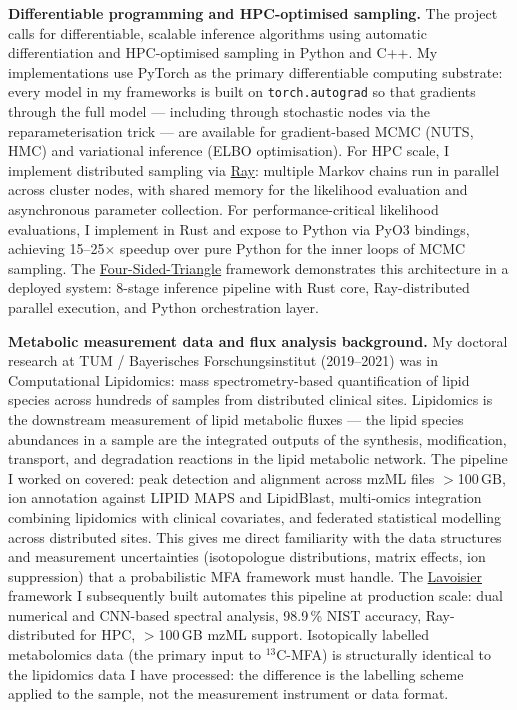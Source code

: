 \documentclass[12pt,a4paper]{article}
\begin{document}
\textbf{Differentiable programming and HPC-optimised sampling.}
The project calls for differentiable, scalable inference algorithms using
automatic differentiation and HPC-optimised sampling in Python and C++.
My implementations use PyTorch as the primary differentiable computing
substrate: every model in my frameworks is built on \texttt{torch.autograd}
so that gradients through the full model --- including through stochastic
nodes via the reparameterisation trick --- are available for gradient-based
MCMC (NUTS, HMC) and variational inference (ELBO optimisation).
For HPC scale, I implement distributed sampling via
\href{https://github.com/ray-project/ray}{Ray}: multiple Markov chains run
in parallel across cluster nodes, with shared memory for the likelihood
evaluation and asynchronous parameter collection.
For performance-critical likelihood evaluations, I implement in Rust and
expose to Python via PyO3 bindings, achieving 15--25$\times$ speedup over
pure Python for the inner loops of MCMC sampling.
The \href{https://github.com/fullscreen-triangle/four-sided-triangle}{Four-Sided-Triangle}
framework demonstrates this architecture in a deployed system: 8-stage
inference pipeline with Rust core, Ray-distributed parallel execution,
and Python orchestration layer.

\textbf{Metabolic measurement data and flux analysis background.}
My doctoral research at TUM / Bayerisches Forschungsinstitut (2019--2021)
was in Computational Lipidomics: mass spectrometry-based quantification of
lipid species across hundreds of samples from distributed clinical sites.
Lipidomics is the downstream measurement of lipid metabolic fluxes --- the
lipid species abundances in a sample are the integrated outputs of the
synthesis, modification, transport, and degradation reactions in the lipid
metabolic network.
The pipeline I worked on covered: peak detection and alignment across
mzML files $>$100\,GB, ion annotation against LIPID MAPS and LipidBlast,
multi-omics integration combining lipidomics with clinical covariates, and
federated statistical modelling across distributed sites.
This gives me direct familiarity with the data structures and measurement
uncertainties (isotopologue distributions, matrix effects, ion suppression)
that a probabilistic MFA framework must handle.
The \href{https://github.com/fullscreen-triangle/lavoisier}{Lavoisier}
framework I subsequently built automates this pipeline at production scale:
dual numerical and CNN-based spectral analysis, 98.9\,\% NIST accuracy,
Ray-distributed for HPC, $>$100\,GB mzML support.
Isotopically labelled metabolomics data (the primary input to $^{13}$C-MFA)
is structurally identical to the lipidomics data I have processed: the
difference is the labelling scheme applied to the sample, not the measurement
instrument or data format.
\end{document}
